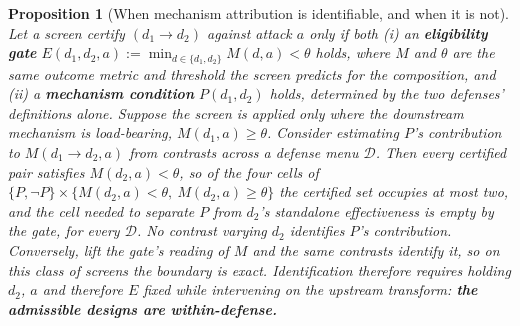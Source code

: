 \documentclass{article}
\newtheorem{proposition}[theorem]{Proposition}
\begin{document}
\begin{proposition}[When mechanism attribution is identifiable, and when it is not]
\label{prop:identification}
Let a screen certify $(d_1 \to d_2)$ against attack $a$ only if both
(i) an \textbf{eligibility gate} $E(d_1,d_2,a) := \min_{d \in \{d_1,d_2\}} M(d,a) < \theta$ holds, where $M$ and $\theta$ are the \emph{same} outcome metric and threshold the screen predicts for the composition, and
(ii) a \textbf{mechanism condition} $P(d_1,d_2)$ holds, determined by the two defenses' definitions alone.
Suppose the screen is applied only where the downstream mechanism is load-bearing, $M(d_1,a) \ge \theta$. Consider estimating $P$'s contribution to $M(d_1 \to d_2, a)$ from contrasts across a defense menu $\mathcal{D}$. Then every certified pair satisfies $M(d_2,a) < \theta$, so of the four cells of $\{P,\neg P\} \times \{M(d_2,a) < \theta,\ M(d_2,a) \ge \theta\}$ the certified set occupies at most two, and the cell needed to separate $P$ from $d_2$'s standalone effectiveness is empty by the gate, for every $\mathcal{D}$. No contrast varying $d_2$ identifies $P$'s contribution. Conversely, lift the gate's reading of $M$ and the same contrasts identify it, so on this class of screens the boundary is exact. Identification therefore requires holding $d_2$, $a$ and therefore $E$ fixed while intervening on the upstream transform: \textbf{the admissible designs are within-defense.}
\end{proposition}
\end{document}
